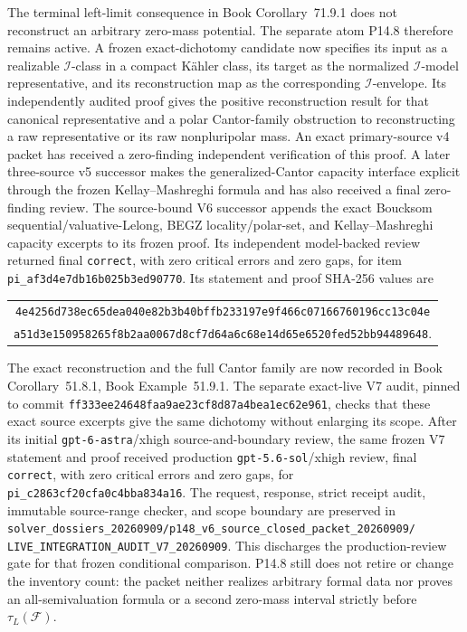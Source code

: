 \documentclass[11pt,a4paper]{article}
\theoremstyle{definition}
\theoremstyle{remark}
\begin{document}
The terminal left-limit consequence in
Book Corollary~71.9.1 does not reconstruct an arbitrary
zero-mass potential.  The separate atom P14.8 therefore remains active.  A
frozen exact-dichotomy candidate now specifies its input as a realizable
\(\mathcal I\)-class in a compact K\"ahler class, its target as the normalized
\(\mathcal I\)-model representative, and its reconstruction map as the
corresponding \(\mathcal I\)-envelope.  Its independently audited proof gives
the positive reconstruction result for that canonical representative and a
polar Cantor-family obstruction to reconstructing a raw representative or
its raw nonpluripolar mass.  An exact primary-source v4 packet has received a
zero-finding independent verification of this proof.  A later three-source
v5 successor makes the generalized-Cantor capacity interface explicit through
the frozen Kellay--Mashreghi formula and has also received a final
zero-finding review.  The source-bound V6 successor appends the exact
Boucksom sequential/valuative-Lelong, BEGZ locality/polar-set, and
Kellay--Mashreghi capacity excerpts to its frozen proof.  Its independent
model-backed review returned final \texttt{correct}, with zero critical
errors and zero gaps, for item
\nolinkurl{pi_af3d4e7db16b025b3ed90770}.  Its statement and proof SHA-256
values are
\begin{center}
\small
\begin{tabular}{@{}c@{}}
\nolinkurl{4e4256d738ec65dea040e82b3b40bffb233197e9f466c07166760196cc13c04e}\\
\nolinkurl{a51d3e150958265f8b2aa0067d8cf7d64a6c68e14d65e6520fed52bb94489648}.
\end{tabular}
\end{center}
The exact reconstruction and the full Cantor family are now recorded in
Book Corollary~51.8.1, Book Example~51.9.1.  The separate
exact-live V7 audit, pinned to commit
\nolinkurl{ff333ee24648faa9ae23cf8d87a4bea1ec62e961}, checks that these
exact source excerpts give the same dichotomy without enlarging its scope.
After its initial \texttt{gpt-6-astra}/xhigh source-and-boundary review, the
same frozen V7 statement and proof received production
\texttt{gpt-5.6-sol}/xhigh review, final \texttt{correct}, with zero critical
errors and zero gaps, for \nolinkurl{pi_c2863cf20cfa0c4bba834a16}.  The
request, response, strict receipt audit, immutable source-range checker, and
scope boundary are preserved in
\nolinkurl{solver_dossiers_20260909/p148_v6_source_closed_packet_20260909/}
\nolinkurl{LIVE_INTEGRATION_AUDIT_V7_20260909}.  This discharges the
production-review gate for that frozen conditional comparison.  P14.8 still
does not retire or change the inventory count: the packet neither realizes
arbitrary formal data nor proves an all-semivaluation formula or a second
zero-mass interval strictly before \(\tau_L(\mathcal F)\).
\end{document}
